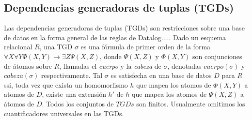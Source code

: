\documentclass[11pt,a4paper,twoside]{tesis}
\newtheorem{exmp}{Ejemplo}
\begin{document}

\subsection{Dependencias generadoras de tuplas (TGDs)}
Las dependencias generadoras de tuplas (TGDs) son restricciones sobre una base de datos en la forma general de las reglas de Datalog.....
Dado un esquema relacional $R$, una TGD $\sigma$ es una fórmula de primer orden de la forma $\forall X \forall Y \Phi (X, Y) \rightarrow \exists Z \Psi (X, Z)$, donde $ \Psi (X, Z)$ y $\Phi (X, Y)$ son conjunciones de átomos sobre $R$, llamadas el \textit{cuerpo} y la \textit{cabeza} de $\sigma$, denotadas $cuerpo(\sigma)$ y $cabeza(\sigma)$ respectivamente. Tal $\sigma$ es satisfecha en una base de datos $D$ para $R$ ssi, toda vez que exista un homomorfismo $h$ que mapea los atomos de $\Phi(X, Y)$ a atomos de $D$, existe una extensión $h\prime$ de $h$ que mapea los atomos de $\Psi (X, Z)$ a átomos de $D$. Todos los conjuntos de $TGDs$ son finitos. Usualmente omitimos los cuantificadores universales en las TGDs.

\end{document}
